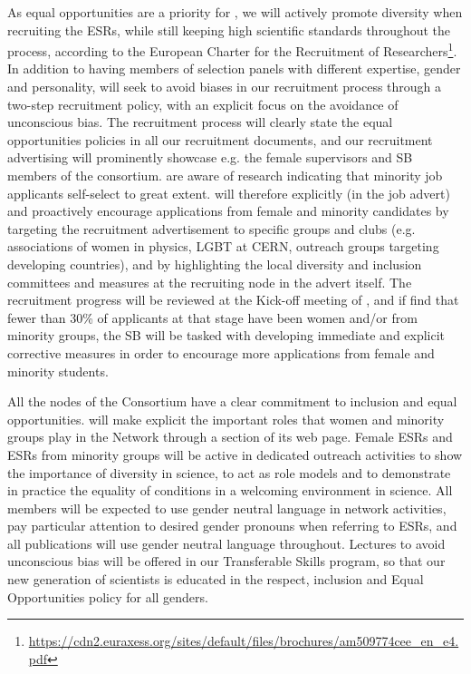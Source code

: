 
As equal opportunities are a priority for \acronym, we will
actively promote diversity when recruiting the ESRs, while still keeping high scientific
standards throughout the process, according to the European Charter for the Recruitment of Researchers\footnote{
\url{https://cdn2.euraxess.org/sites/default/files/brochures/am509774cee_en_e4.pdf}}. 
In addition to having members of selection panels with
different expertise, gender and personality, \acronym will seek to avoid
biases in our recruitment process through a two-step recruitment policy, with
an explicit focus on the avoidance of unconscious bias.
The \acronym recruitment process will clearly state
the equal opportunities policies in all our recruitment documents,
and our recruitment advertising will prominently
showcase e.g. the female supervisors and SB members of the consortium. 
\acronym are aware of research indicating that minority job applicants
self-select to great extent. \acronym will therefore explicitly (in the job advert)
and proactively encourage applications from female 
and minority candidates by targeting the recruitment advertisement
to specific groups and clubs (e.g. associations of women in physics, 
LGBT at CERN, outreach groups targeting developing countries),
and by highlighting the local diversity and inclusion committees and measures
at the recruiting node in the advert itself. 
The recruitment progress will be reviewed at the
Kick-off meeting of \acronym, and if \acronym find that fewer
than 30\% of applicants at that stage have been women
and/or from minority groups, the SB will be tasked with developing
immediate and explicit corrective measures in order
to encourage more applications from female and minority students.  

All the nodes of the Consortium have a clear commitment to
inclusion and equal opportunities. \acronym will make explicit the
important roles that women and minority groups play in the Network through a section of its web page. 
Female ESRs and ESRs from minority groups will be active in dedicated outreach
activities to show the importance of diversity in science, to act as role models and to demonstrate
in practice the equality of conditions in a welcoming environment in science. 
All \acronym members will be expected to use gender neutral language
in network activities, pay particular attention to desired gender pronouns when referring to ESRs, 
and all \acronym publications will use gender neutral language throughout.
Lectures to avoid unconscious bias will be offered in our Transferable Skills program,
so that our new generation of scientists is educated in the respect, inclusion and
Equal Opportunities policy for all genders.


